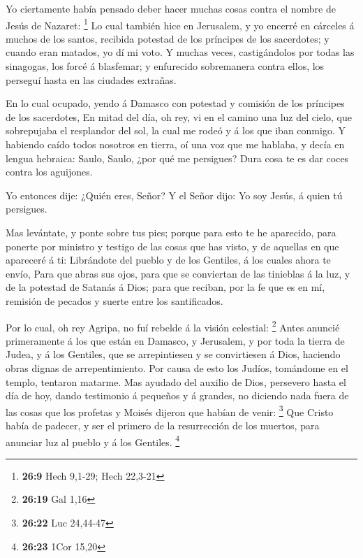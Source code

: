  Yo ciertamente había pensado deber hacer muchas cosas
contra el nombre de Jesús de Nazaret: \footnote{\textbf{26:9} Hech
  9,1-29; Hech 22,3-21}  Lo cual también hice en Jerusalem,
y yo encerré en cárceles á muchos de los santos, recibida potestad de
los príncipes de los sacerdotes; y cuando eran matados, yo dí mi voto.
 Y muchas veces, castigándolos por todas las sinagogas, los
forcé á blasfemar; y enfurecido sobremanera contra ellos, los perseguí
hasta en las ciudades extrañas.

 En lo cual ocupado, yendo á Damasco con potestad y
comisión de los príncipes de los sacerdotes,  En mitad del
día, oh rey, vi en el camino una luz del cielo, que sobrepujaba el
resplandor del sol, la cual me rodeó y á los que iban conmigo.
 Y habiendo caído todos nosotros en tierra, oí una voz que
me hablaba, y decía en lengua hebraica: Saulo, Saulo, ¿por qué me
persigues? Dura cosa te es dar coces contra los aguijones.

 Yo entonces dije: ¿Quién eres, Señor? Y el Señor dijo: Yo
soy Jesús, á quien tú persigues.

 Mas levántate, y ponte sobre tus pies; porque para esto te
he aparecido, para ponerte por ministro y testigo de las cosas que has
visto, y de aquellas en que apareceré á ti:  Librándote del
pueblo y de los Gentiles, á los cuales ahora te envío, 
Para que abras sus ojos, para que se conviertan de las tinieblas á la
luz, y de la potestad de Satanás á Dios; para que reciban, por la fe que
es en mí, remisión de pecados y suerte entre los santificados.

 Por lo cual, oh rey Agripa, no fuí rebelde á la visión
celestial: \footnote{\textbf{26:19} Gal 1,16}  Antes
anuncié primeramente á los que están en Damasco, y Jerusalem, y por toda
la tierra de Judea, y á los Gentiles, que se arrepintiesen y se
convirtiesen á Dios, haciendo obras dignas de arrepentimiento.
 Por causa de esto los Judíos, tomándome en el templo,
tentaron matarme.  Mas ayudado del auxilio de Dios,
persevero hasta el día de hoy, dando testimonio á pequeños y á grandes,
no diciendo nada fuera de las cosas que los profetas y Moisés dijeron
que habían de venir: \footnote{\textbf{26:22} Luc 24,44-47}
 Que Cristo había de padecer, y ser el primero de la
resurrección de los muertos, para anunciar luz al pueblo y á los
Gentiles. \footnote{\textbf{26:23} 1Cor 15,20}

